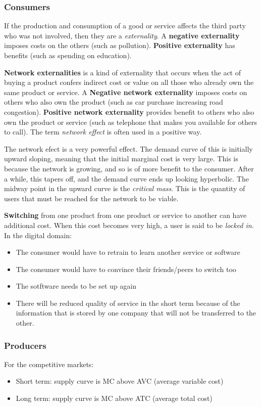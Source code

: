 \documentclass[11pt,a4paper,titlepage,dvipsnames,cmyk]{scrartcl}
\begin{document}
\subsubsection{Consumers}
If the production and consumption of a good or service affects the third party who was not involved, then they are a \textit{externality}. A \textbf{negative externality} imposes costs on the others (such as pollution). \textbf{Positive externality} has benefits (such as spending on education).

\textbf{Network externalities} is a kind of externality that occurs when the act of buying a product confers indirect cost or value on all those who already own the same product or service. A \textbf{Negative network externality} imposes costs on others who also own the product (such as car purchase increasing road congestion). \textbf{Positive network externality} provides benefit to others who also own the product or service (such as telephone that makes you available for others to call). The term \textit{network effect} is often used in a positive way.

The network efect is a very powerful effect. The demand curve of this is initially upward sloping, meaning that the initial marginal cost is very large. This is because the network is growing, and so is of more benefit to the consumer. After a while, this tapers off, and the demand curve ends up looking hyperbolic. The midway point in the upward curve is the \textit{critical mass}. This is the quantity of users that must be reached for the network to be viable.

\textbf{Switching} from one product from one product or service to another can have additional cost. When this cost becomes very high, a user is said to be \textit{locked in}. In the digital domain:
\begin{itemize}
    \item The consumer would have to retrain to learn another service or software
    \item The consumer would have to convince their friends/peers to switch too
    \item The sotftware needs to be set up again
    \item There will be reduced quality of service in the short term because of the information that is stored by one company that will not be transferred to the other.
\end{itemize}

\subsubsection{Producers}
For the competitive markets:
\begin{itemize}
    \item Short term: supply curve is MC above AVC (average variable cost)
    \item Long term: supply curve is MC above ATC (average total cost)
\end{itemize}
\end{document}
